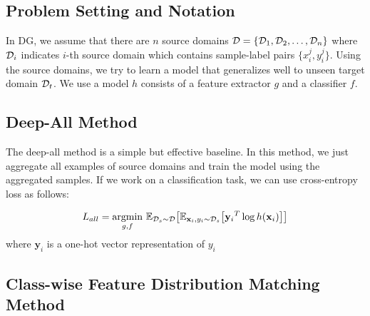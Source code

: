 \subsection{Problem Setting and Notation}
In DG, we assume that there are $n$ source domains $\mathcal{D} = \{\mathcal{D}_1, \mathcal{D}_2, \dots, \mathcal{D}_n\}$ where $\mathcal{D}_i$ indicates $i$-th source domain which contains sample-label pairs $\{x_i^j, y_i^j\}$. Using the source domains, we try to learn a model that generalizes well to unseen target domain $\mathcal{D}_t$. We use a model $h$ consists of a feature extractor $g$ and a classifier $f$. 

\subsection{Deep-All Method}
The deep-all method is a simple but effective baseline. In this method, we just aggregate all examples of source domains and train the model using the aggregated samples. If we work on a classification task, we can use cross-entropy loss as follows:

\begin{equation}
\label{eq:agg}
\begin{aligned}
L_{all} = \underset{g, f}{\operatorname{argmin}}~ \mathbb{E}_{\mathcal{D}_s\sim\mathcal{D}} \big[ \mathbb{E}_{\mathbf{x}_i,y_i\sim \mathcal{D}_s} \big[  {\mathbf{y}_i}^{T} \log h(\mathbf{x}_i) \big] \big]
\end{aligned}
\end{equation}
where $\mathbf{y}_i$ is a one-hot vector representation of $y_i$

\subsection{Class-wise Feature Distribution Matching Method}